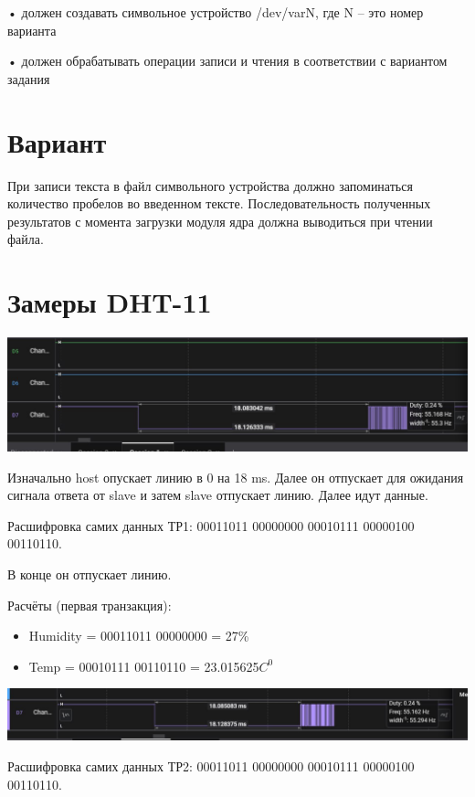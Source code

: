 \documentclass{article}
\begin{document}
• должен создавать символьное устройство /dev/varN, где N – это
номер варианта

• должен обрабатывать операции записи и чтения в соответствии с
вариантом задания

\section{Вариант}

При записи текста в файл символьного устройства должно
запоминаться количество пробелов во введенном тексте.
Последовательность полученных результатов с момента
загрузки модуля ядра должна выводиться при чтении файла.

\section{Замеры DHT-11}

\begin{center}
  \includegraphics[width=.9\textwidth]{dht-11}
\end{center}
Изначально host опускает линию в 0 на 18 ms. Далее он отпускает для ожидания сигнала ответа от slave и затем slave отпускает линию.
Далее идут данные.

Расшифровка самих данных ТР1: 00011011 00000000 00010111 00000100 00110110.

В конце он отпускает линию.

Расчёты (первая транзакция): 
\begin{itemize}
  \item Humidity = 00011011 00000000 = 27\%
  \item Temp = 00010111 00110110 = 23.015625$C^0$
\end{itemize}

\begin{center}
  \includegraphics[width=.9\textwidth]{dht-11-2}
\end{center}

Расшифровка самих данных ТР2: 00011011 00000000 00010111 00000100 00110110.
\end{document}
